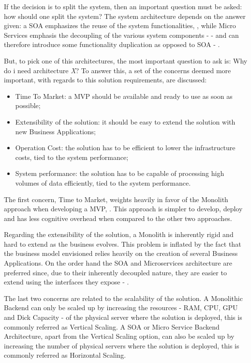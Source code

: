 If the decision is to split the system, then an important question must be asked: how should one split the system? The system architecture depends on the answer given: a \gls{SOA} emphasizes the reuse of the system functionalities, \cite{ibmsoa}, while Micro Services emphasis the decoupling of the various system components - \cite{micromicro} - and can therefore introduce some functionality duplication as opposed to \gls{SOA} - \cite{soavsmicro}.

But, to pick one of this architectures, the most important question to ask is: Why do i need architecture \textit{X}? To answer this, a set of the concerns deemed more important, with regards to this solution requirements, are discussed:

\begin{itemize}
   \item Time To Market: a \gls{MVP} should be available and ready to use as soon as possible;
   \item Extensibility of the solution: it should be easy to extend the solution with new Business Applications;
   \item Operation Cost: the solution has to be efficient to lower the infrastructure costs, tied to the system performance;
   \item System performance: the solution has to be capable of processing high volumes of data efficiently, tied to the system performance.
\end{itemize}

The first concern, Time to Market, weights heavily in favor of the Monolith approach when developing a \gls{MVP}, \cite{atlassianmono}. This approach is simpler to develop, deploy and has less cognitive overhead when compared to the other two approaches.

Regarding the extensibility of the solution, a Monolith is inherently rigid and hard to extend as the business evolves. This problem is inflated by the fact that the business model envisioned relies heavily on the creation of several Business Applications. On the order hand the \gls{SOA} and Microservices architecture are preferred since, due to their inherently decoupled nature, they are easier to extend using the interfaces they expose - \cite{microsoftmicro}.

The last two concerns are related to the scalability of the solution. A Monolithic Backend can only be scaled up by increasing the resources - RAM, CPU, GPU and Dick Capacity - of the physical server where the solution is deployed, this is commonly referred as Vertical Scaling. A \gls{SOA} or Micro Service Backend Architecture, apart from the Vertical Scaling option, can also be scaled up by increasing the number of physical servers where the solution is deployed, this is commonly referred as Horizontal Scaling.

